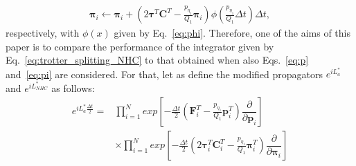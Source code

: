 \documentclass[aip,jcp,reprint,amsmath,amssymb]{revtex4-1}
\newcommand{\mt}[1]{\boldsymbol{\mathbf{#1}}}           %
\newcommand{\vt}[1]{\boldsymbol{\mathbf{#1}}}           %
\newcommand{\tr}[1]{#1^T}                               %
\newcommand{\diff}[2]{\dfrac{\partial #1}{\partial #2}} %
\begin{document}
\begin{equation}
\label{eq:pi}
\begin{split}
{\vt \pi}_i \leftarrow {\vt \pi}_i + \left(2 \tr{\vt \tau} \tr{\mt C} - \frac{p_{\eta_1}}{Q_1} {\vt \pi}_i \right) \phi\left(\frac{p_{\eta_1}}{Q_1} \Delta t \right) \Delta t,
\end{split}
\end{equation}
respectively, with $\phi(x)$ given by Eq.~\ref{eq:phi}. Therefore, one of the aims of this paper is to compare the performance of the integrator given by Eq.~\ref{eq:trotter_splitting_NHC} to that obtained when also Eqs.~\ref{eq:p} and~\ref{eq:pi} are considered. For that, let as define the modified propagators $ e^{i L^\ast_a} $ and $ e^{i L^\ast_{NHC}} $ as follows:
\begin{equation}
\begin{split}
e^{iL^\ast_a \frac{\Delta t}{2}} = &\prod_{i=1}^{N} exp\left[-\frac{\Delta t}{2} \left( \vt F_i^T - \frac{p_{\eta_1}}{Q_1}\vt p_i^T \right) \diff{}{\vt p_i} \right] \\
&\times \prod_{i=1}^{N} exp\left[-\frac{\Delta t}{2} \left(2 \vt \tau_i^T \mt C_i^T -  \frac{p_{\eta_1}}{Q_1}\vt \pi_i^T \right)  \diff{}{\vt \pi_i}   \right]
\end{split}
\end{equation}
\end{document}
